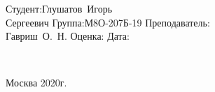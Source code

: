 \begin{titlepage}
\vspace{2em}
{
	\hfill\parbox{11cm}{
		\hspace*{10cm}\hspace*{-5cm}Студент:\hfill\hbox {Глушатов Игорь \hfill}\\
		\hspace*{10cm}\hspace*{-5cm}\hfill\hbox {Сергеевич\hfill}\vspace{2mm}
		\hspace*{10cm}\hspace*{-5cm}Группа:\hfill\hbox {М8О-207Б-19}\vspace{2mm}
		\hspace*{10cm}\hspace*{-5cm}Преподаватель:\\
		\hspace*{10cm}\hspace*{-5cm}\hfill\hbox {Гавриш О. Н.}\vspace{2mm}
		\hspace*{10cm}\hspace*{-5cm}Оценка:\hfill\hbox {}\vspace{2mm}
		\hspace*{10cm}\hspace*{-5cm}Дата:\hfill\hbox {}\\
	}
\\}

\vspace{\fill}
\begin{center}
Москва 2020г.
\end{center}
\end{titlepage}